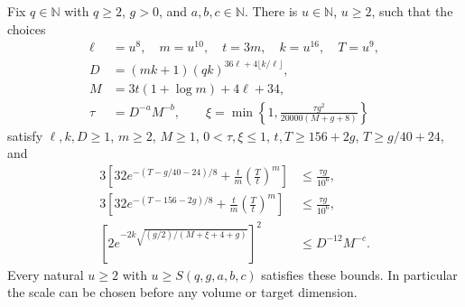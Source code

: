 \begin{theorem}
    \label{thm:soft_family_calibration}
    \leanok
    Fix $q\in\mathbb N$ with $q\ge2$, $g>0$, and
    $a,b,c\in\mathbb N$. There is $u\in\mathbb N$, $u\ge2$, such that
    the choices
    \begin{align}
        \ell & =u^8,\quad m=u^{10},\quad t=3m,\quad k=u^{16},\quad T=u^9, \\
        D    & =(mk+1)(qk)^{36\ell+4\lfloor k/\ell\rfloor},               \\
        M    & =3t(1+\log m)+4\ell+34,                                    \\
        \tau & =D^{-a}M^{-b},\qquad
        \xi=\min\left\{1,\frac{\tau g^2}{20000(M+g+8)}\right\}
    \end{align}
    satisfy $\ell,k,D\ge1$, $m\ge2$, $M\ge1$, $0<\tau,\xi\le1$,
    $t,T\ge156+2g$, $T\ge g/40+24$, and
    \begin{align}
        3\left[32e^{-(T-g/40-24)/8}
             +\frac tm\left(\frac Tt\right)^m\right]
         & \le\frac{\tau g}{10^6}, \\
        3\left[32e^{-(T-156-2g)/8}
             +\frac tm\left(\frac Tt\right)^m\right]
         & \le\frac{\tau g}{10^6}, \\
        \left[2e^{-2k\sqrt{(g/2)/(M+\xi+4+g)}}\right]^2
         & \le D^{-12}M^{-c}.
    \end{align}
    Every natural $u\ge2$ with $u\ge S(q,g,a,b,c)$ satisfies these bounds.
    In particular the scale can be chosen before any volume or target dimension.
\end{theorem}
